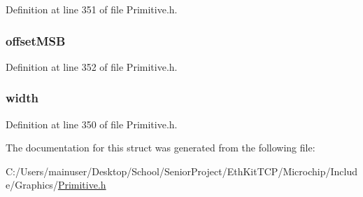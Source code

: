 Definition at line 351 of file Primitive.\+h.

\hypertarget{struct_g_l_y_p_h___e_n_t_r_y_ad770f0e3b61afda38e40b15bf56484ee}{}
\subsubsection[{offset\+M\+S\+B}]{ offset\+M\+S\+B}\label{struct_g_l_y_p_h___e_n_t_r_y_ad770f0e3b61afda38e40b15bf56484ee}


Definition at line 352 of file Primitive.\+h.

\hypertarget{struct_g_l_y_p_h___e_n_t_r_y_ad471bc246135d293139a6d1615727c48}{}
\subsubsection[{width}]{ width}\label{struct_g_l_y_p_h___e_n_t_r_y_ad471bc246135d293139a6d1615727c48}


Definition at line 350 of file Primitive.\+h.



The documentation for this struct was generated from the following file\+:\begin{DoxyCompactItemize}
\item 
C\+:/\+Users/mainuser/\+Desktop/\+School/\+Senior\+Project/\+Eth\+Kit\+T\+C\+P/\+Microchip/\+Include/\+Graphics/\hyperlink{_primitive_8h}{Primitive.\+h}\end{DoxyCompactItemize}
